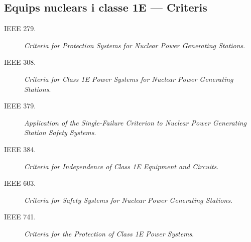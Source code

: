 \subsection*{Equips nuclears i classe 1E --- Criteris} 
\begin{description}
    \item [\hspace{5mm}IEEE 279.] \textit{Criteria for Protection Systems for Nuclear Power Generating Stations}.
    \item [\hspace{5mm}IEEE 308.] \textit{Criteria for Class 1E Power Systems for Nuclear Power Generating Stations}.
    \item [\hspace{5mm}IEEE 379.] \textit{Application of the Single-Failure Criterion to Nuclear Power Generating Station Safety Systems}.
    \item [\hspace{5mm}IEEE 384.] \textit{Criteria for Independence of Class 1E Equipment and Circuits}.
    \item [\hspace{5mm}IEEE 603.] \textit{Criteria for Safety Systems for Nuclear Power Generating Stations}.
    \item [\hspace{5mm}IEEE 741.] \textit{Criteria for the Protection of Class 1E Power Systems}.
\end{description}


